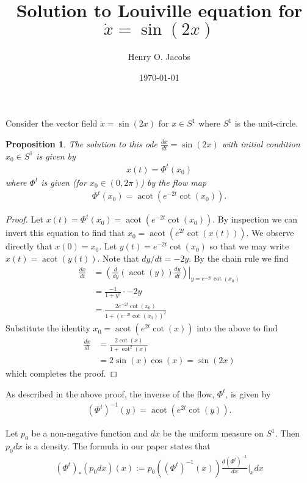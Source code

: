 \documentclass[12pt]{amsart}
\title{Solution to Louiville equation for $\dot{x} = \sin(2x)$}
\author{Henry O. Jacobs}
\date{\today}
\newtheorem{prop}[thm]{Proposition}
\DeclareMathOperator{\acot}{acot}
\begin{document}
\maketitle

Consider the vector field $\dot{x} = \sin(2x)$ for $x \in S^1$ where
$S^1$ is the unit-circle.

\begin{prop}
  The solution to this ode $\frac{dx}{dt} = \sin(2x)$
  with initial condition $x_0 \in S^1$ is given by
  \begin{align*}
  x(t) = \Phi^t(x_0)
\end{align*}
where $\Phi^t$ is given (for $x_0 \in (0,2\pi)$) by the flow map
\begin{align*}
  \Phi^t(x_0) = \acot( e^{-2t} \cot(x_0) ).
\end{align*}
\end{prop}
\begin{proof}
  Let $x(t) = \Phi^t(x_0) =\acot(e^{-2t}\cot(x_0))$.
  By inspection we can invert this equation to find that
  $x_0 = \acot( e^{2t} \cot(x(t) ) )$.
  We observe directly that $x(0) = x_0$.
  Let $y(t) = e^{-2t} \cot(x_0)$ so that we may write $x(t) = \acot(y(t))$.
  Note that $dy/dt = -2y$.
  By the chain rule we find
  \begin{align*}
    \frac{dx}{dt} &= \left.
      \left( \frac{d}{dy}( \acot(y) ) \frac{dy}{dt} \right)
      \right|_{y= e^{-2t} \cot(x_0) } \\
      &= \frac{-1}{1 + y^2} \cdot -2 y \\
      &= \frac{2e^{-2t} \cot( x_0)}{1+( e^{-2t} \cot(x_0) )^2 }
  \end{align*}
  Substitute the identity $x_0 = \acot( e^{2t} \cot(x) )$ into the above to find
  \begin{align*}
    \frac{dx}{dt} &= \frac{2  \cot(x) }{ 1+ \cot^2(x) } \\
    &= 2 \sin(x) \cos(x) = \sin(2x)
  \end{align*}
  which completes the proof.
\end{proof}


As described in the above proof,
the inverse of the flow, $\Phi^t$, is given by
\begin{align*}
  (\Phi^t)^{-1}(y) = \acot( e^{2t} \cot(y) ).
\end{align*}

Let $p_0$ be a non-negative function and $dx$ be the uniform measure on $S^1$.
Then $p_0 dx$ is a density.
The formula in our paper states that 
\begin{align*}
  (\Phi^t)_*( p_0 dx)(x) := p_0 ((\Phi^t)^{-1}(x)) \frac{d (\Phi^t)^{-1}}{dx}|_{x} dx
\end{align*}
\end{document}
